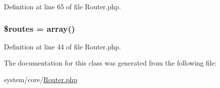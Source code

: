 Definition at line 65 of file Router.\-php.

\hypertarget{class_c_i___router_a8f7eb04a54e0f0bfc0cedeb9899ce4a8}{
\subsubsection[{\$routes}]{\setlength{\rightskip}{0pt plus 5cm}\$routes = array()}}\label{class_c_i___router_a8f7eb04a54e0f0bfc0cedeb9899ce4a8}


Definition at line 44 of file Router.\-php.



The documentation for this class was generated from the following file\-:\begin{DoxyCompactItemize}
\item 
system/core/\hyperlink{_router_8php}{Router.\-php}\end{DoxyCompactItemize}
